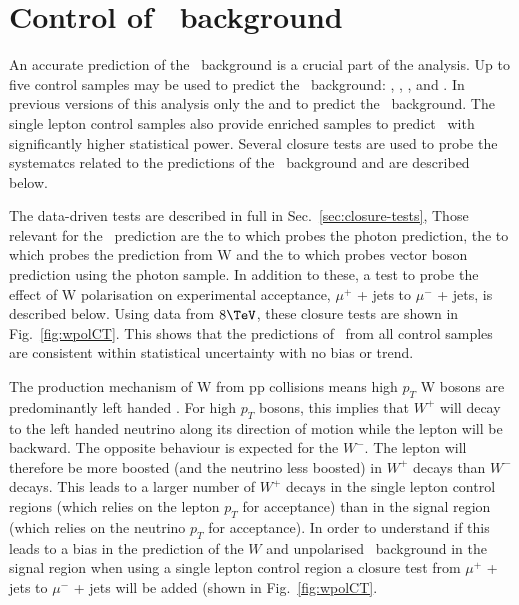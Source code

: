 \clearpage
\section{Control of \zInv\ background \label{app:zInvBgControl}}


An accurate prediction of the \zInv\ background is a crucial part 
of the analysis. Up to five control samples may be used 
to predict the \zInv\ background: \mj, \mmj, \ej, \eej and \gj. 
In previous versions of this analysis only the \zmmj and 
\gj to predict the \zInv\ background. The single
lepton control samples also provide \wj enriched samples to predict
\zInv\ with significantly higher statistical power. 
Several closure tests are used to probe the 
systematcs related to the predictions of the \zInv\ background
and are described below.

The data-driven tests are described in full in Sec.~\ref{sec:closure-tests},
Those relevant for the \zInv\ prediction are the \mmj to \gj
which probes the photon prediction, the \mj to \mmj which probes the
prediction from W and the \mj to \gj which probes vector boson prediction 
using the photon sample. In addition to these, a test to probe the effect
of W polarisation on experimental acceptance, $\mu^+$ + jets to $\mu^-$ + jets,
is described below. Using data from $8\TeV$, 
these closure tests are shown in Fig.~\ref{fig:wpolCT}.
This shows that the predictions of \zInv\ from
all control samples are consistent within statistical 
uncertainty with no bias or trend. 


The production mechanism of W from pp collisions means
high $p_T$ W bosons are predominantly left handed \cite{WPol}.  
For high $p_T$ bosons, this implies that $W^+$ will decay 
to the left handed neutrino along its direction of motion while 
the lepton will be backward. The opposite behaviour is
expected for the $W^-$. The lepton will therefore be more boosted (and
the neutrino less boosted) in $W^+$ decays than $W^-$ decays.  This
leads to a larger number of $W^+$ decays in the single lepton control
regions (which relies on the lepton $p_T$ for acceptance) than in the
signal region (which relies on the neutrino $p_T$ for acceptance). In
order to understand if this leads to a bias in the prediction of the
$W$ and unpolarised \zInv\ background in the signal region when using
a single lepton control region a closure test from $\mu^+$ + jets to
$\mu^-$ + jets will be added (shown in Fig.~\ref{fig:wpolCT}. 

